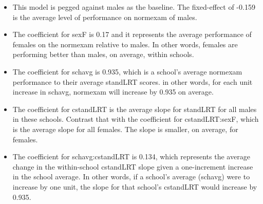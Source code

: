 \documentclass{article}
\begin{document}
\begin{itemize}
  \item This model is pegged against males as the baseline.  The fixed-effect of -0.159 is the average level of performance on normexam of males.  
  \item The coefficient for sexF is 0.17 and it represents the average performance of females on the normexam relative to males.  In other words, females are performing better than males, on average, within schools.
  \item The coefficient for schavg is 0.935, which is a school's average normexam performance to their average standLRT scores.  in other words, for each unit increase in schavg, normexam will increase by 0.935 on average.
  \item The coefficient for cstandLRT is the average slope for standLRT for all males in these schools.  Contrast that with the coefficient for cstandLRT:sexF, which is the average slope for all females.  The slope is smaller, on average, for females.
  \item The coefficient for schavg:cstandLRT is 0.134, which represents the average change in the within-school cstandLRT slope given a one-increment increase in the school average.  In other words, if a school's average (schavg) were to increase by one unit, the slope for that school's cstandLRT would increase by 0.935.
\end{itemize}
\end{document}
